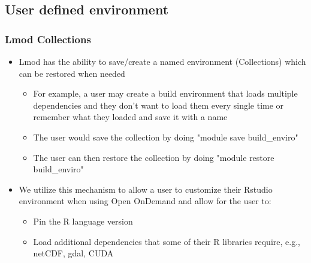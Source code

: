 \subsection[rstudiodeps]{User defined environment}
\begin{frame}
	\frametitle{Lmod Collections}
	\begin{block}{}
	\begin{itemize}
		\item Lmod has the ability to save/create a named environment (Collections) which can be restored when needed
		\begin{itemize}
			\item For example, a user may create a build environment that loads multiple dependencies and they don't want to load them every single time or remember what they loaded and save it with a name
			\item The user would save the collection by doing "module save build\_enviro" 
			\item The user can then restore the collection by doing "module restore build\_enviro"
		\end{itemize}
		\item  We utilize this mechanism to allow a user to customize their Rstudio environment when using Open OnDemand and allow for the user to:
		\begin{itemize}
			\item Pin the R language version
			\item Load additional dependencies that some of their R libraries require, e.g., netCDF, gdal, CUDA
		\end{itemize}
	\end{itemize}
	\end{block}
\end{frame}



